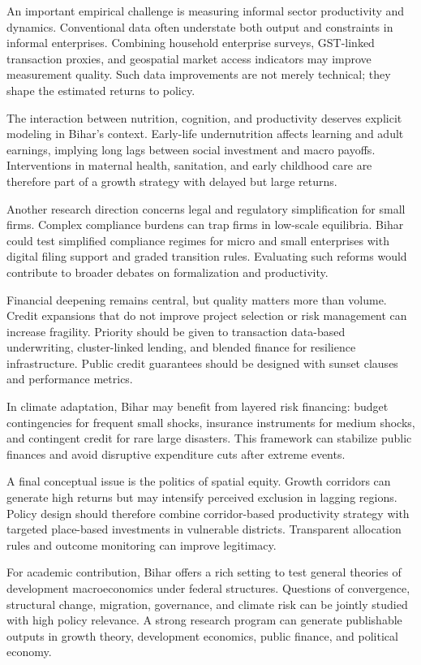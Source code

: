 \documentclass[preprint,12pt]{elsarticle}
\begin{document}
An important empirical challenge is measuring informal sector productivity and dynamics. Conventional data often understate both output and constraints in informal enterprises. Combining household enterprise surveys, GST-linked transaction proxies, and geospatial market access indicators may improve measurement quality. Such data improvements are not merely technical; they shape the estimated returns to policy.

The interaction between nutrition, cognition, and productivity deserves explicit modeling in Bihar's context. Early-life undernutrition affects learning and adult earnings, implying long lags between social investment and macro payoffs. Interventions in maternal health, sanitation, and early childhood care are therefore part of a growth strategy with delayed but large returns.

Another research direction concerns legal and regulatory simplification for small firms. Complex compliance burdens can trap firms in low-scale equilibria. Bihar could test simplified compliance regimes for micro and small enterprises with digital filing support and graded transition rules. Evaluating such reforms would contribute to broader debates on formalization and productivity.

Financial deepening remains central, but quality matters more than volume. Credit expansions that do not improve project selection or risk management can increase fragility. Priority should be given to transaction data-based underwriting, cluster-linked lending, and blended finance for resilience infrastructure. Public credit guarantees should be designed with sunset clauses and performance metrics.

In climate adaptation, Bihar may benefit from layered risk financing: budget contingencies for frequent small shocks, insurance instruments for medium shocks, and contingent credit for rare large disasters. This framework can stabilize public finances and avoid disruptive expenditure cuts after extreme events.

A final conceptual issue is the politics of spatial equity. Growth corridors can generate high returns but may intensify perceived exclusion in lagging regions. Policy design should therefore combine corridor-based productivity strategy with targeted place-based investments in vulnerable districts. Transparent allocation rules and outcome monitoring can improve legitimacy.

For academic contribution, Bihar offers a rich setting to test general theories of development macroeconomics under federal structures. Questions of convergence, structural change, migration, governance, and climate risk can be jointly studied with high policy relevance. A strong research program can generate publishable outputs in growth theory, development economics, public finance, and political economy.
\end{document}
